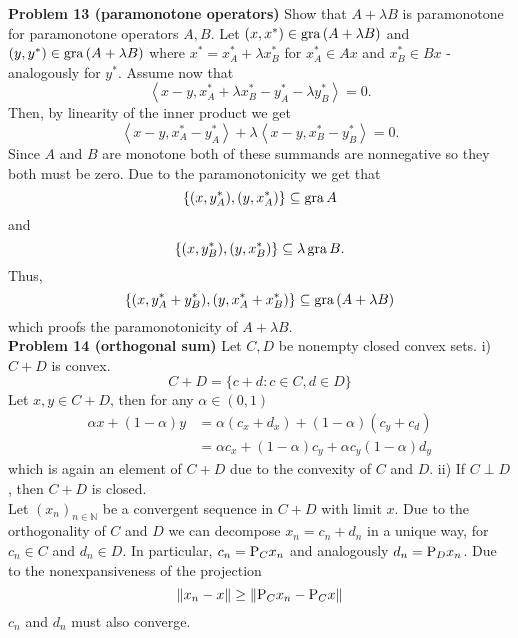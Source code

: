\documentclass{scrartcl}
\newcommand{\N}{\mathbb{N}}
\newcommand{\sub}{\subseteq}
\theoremstyle{plain}
\theoremstyle{remark}
\renewcommand{\P}{\textup{P}}
\newcommand{\gr}{\textup{gra}\,}
\begin{document}
\textbf{Problem 13 (paramonotone operators)} Show that $A+\lambda B$ is paramonotone for paramonotone operators $A,B$.
Let $(x,x^*) \in  \gr (A+\lambda B)$ and $(y,y^*) \in \gr (A + \lambda B)$ where $x^* = x_A^* + \lambda x_B^*$ for $x_A^* \in Ax$ and $x_B^* \in Bx$ - analogously for $y^*$.
Assume now that
\begin{equation}
  \left\langle x-y, x_A^* + \lambda x_B^* - y_A^* - \lambda y_B^* \right\rangle = 0.
\end{equation}
Then, by linearity of the inner product we get
\begin{equation}
  \left\langle x-y, x_A^*  - y_A^*  \right\rangle + \lambda \left\langle x-y, x_B^* - y_B^* \right\rangle = 0.
\end{equation}
Since $A$ and $B$ are monotone both of these summands are nonnegative so they both must be zero.
Due to the paramonotonicity we get that
\begin{equation}
  \{(x,y_A^*), (y, x_A^*) \} \sub \gr A
\end{equation}
and
\begin{equation}
  \{(x,y_B^*), (y, x_B^*) \} \sub \lambda \, \gr B.
\end{equation}
Thus,
\begin{equation}
  \{(x, y_A^* + y_B^*), (y, x_A^* + x_B^*)\} \sub \gr (A + \lambda B)
\end{equation}
which proofs the paramonotonicity of $A+\lambda B$.\\


\textbf{Problem 14 (orthogonal sum)} Let $C, D$ be nonempty closed convex sets.
i) $C+D$ is convex.
\begin{equation}
  C+D = \{c+d : c \in C, d \in D\}
\end{equation}
Let $x,y \in C+D$, then for any $\alpha \in (0,1)$
\begin{equation}
  \begin{aligned}
    \alpha x+ (1 -\alpha)y &= \alpha(c_x + d_x) + (1-\alpha)(c_y + c_d)\\
    &= \alpha c_x + (1-\alpha) c_y + \alpha c_y (1-\alpha) d_y
  \end{aligned}
\end{equation}
which is again an element of $C+D$ due to the convexity of $C$ and $D$.
ii) If $C \perp D$, then $C+D$ is closed. \\
Let $(x_{n})_{n \in \N}$ be a convergent sequence in $C+D$ with limit $x$. Due to the orthogonality of $C$ and $D$ we can decompose $x_{n} = c_{n} + d_{n}$ in a unique way, for $c_{n} \in C$ and $d_{n} \in D$. In particular, $c_{n} = \P_{C}x_{n}$ and analogously $d_{n} = \P_{D}x_{n}$. Due to the nonexpansiveness of the projection 
\begin{equation}
  \lVert x_{n} - x \rVert \ge \lVert \P_{C}x_{n} - \P_{C}x \rVert
\end{equation}$c_{n}$ and $d_{n}$ must also converge.
\end{document}
